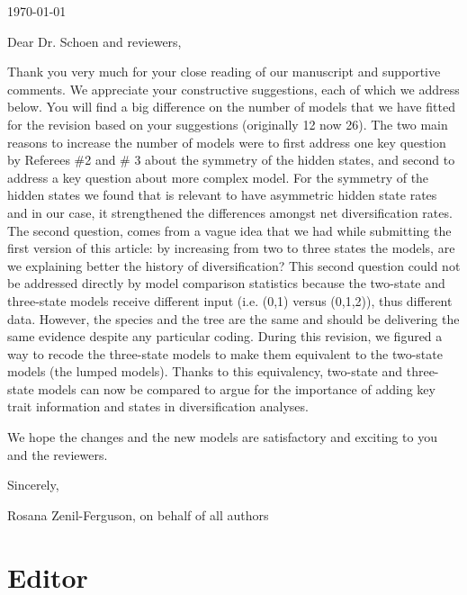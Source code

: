 \documentclass[11pt]{article}
\begin{document}
\hfill \today

Dear Dr. Schoen and reviewers,

\medskip
Thank you very much for your close reading of our manuscript and supportive comments. We appreciate your constructive suggestions, each of which we address below. You will find a big difference on the number of  models  that we have fitted for the revision based on your suggestions (originally 12 now 26). The two main reasons to increase the number of models were to first address one key question by Referees \#2 and \# 3 about the symmetry of the hidden states, and second to address a key question about more complex model. For the symmetry of the hidden states we found that is relevant to have asymmetric hidden state rates and in our case, it strengthened the differences amongst net diversification rates. The second question,  comes from a vague idea that we had while submitting the first version of this article: by increasing from two to three states the models, are we explaining better the history of diversification? This second question could not be addressed directly by model comparison statistics because the two-state and three-state models receive different input (i.e. (0,1) versus (0,1,2)), thus different data. However, the species and the tree are the same and should be delivering the same evidence despite any particular coding. During this revision, we figured a way to recode the three-state models to make them equivalent to the two-state models (the lumped models). Thanks to this equivalency, two-state and three-state models can now be compared to argue for the importance of adding key trait information and states in diversification analyses.

We hope the changes and the new models are satisfactory and exciting to you and the reviewers.

\medskip
Sincerely,

Rosana Zenil-Ferguson, on behalf of all authors


\section{Editor}
\vspace{-11pt}
\end{document}
